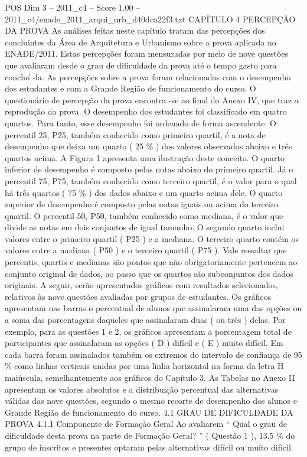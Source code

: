 \begin{textsample}{POS Dim 3 – 2011\_c4 – Score 1.00 – 2011\_c4/enade\_2011\_arqui\_urb\_d40dca22f3.txt}  \label{ex:f3_pos_224}
CAPÍTULO 4 PERCEPÇÃO DA PROVA As análises feitas neste capítulo tratam das percepções dos concluintes da Área de Arquitetura e Urbanismo sobre a prova aplicada no ENADE/2011.
Estas percepções foram mensuradas por meio de nove questões que avaliaram desde o grau de dificuldade da prova até o tempo gasto para concluí -la.
As percepções sobre a prova foram relacionadas com o desempenho dos estudantes e com a Grande Região de funcionamento do curso.
O questionário de percepção da prova encontra -se ao final do Anexo IV, que traz a reprodução da prova.
O desempenho dos estudantes foi classificado em quatro quartos.
Para tanto, esse desempenho foi ordenado de forma ascendente.
O percentil 25, P25, também conhecido como primeiro quartil, é a nota de desempenho que deixa um quarto ( 25 \% ) dos valores observados abaixo e três quartos acima.
A Figura 1 apresenta uma ilustração deste conceito.
O quarto inferior de desempenho é composto pelas notas abaixo do primeiro quartil.
Já o percentil 75, P75, também conhecido como terceiro quartil, é o valor para o qual há três quartos ( 75 \% ) dos dados abaixo e um quarto acima dele.
O quarto superior de desempenho é composto pelas notas iguais ou acima do terceiro quartil.
O percentil 50, P50, também conhecido como mediana, é o valor que divide as notas em dois conjuntos de igual tamanho.
O segundo quarto inclui valores entre o primeiro quartil ( P25 ) e a mediana.
O terceiro quarto contém os valores entre a mediana ( P50 ) e o terceiro quartil ( P75 ).
Vale ressaltar que percentis, quartis e medianas são pontos que não obrigatoriamente pertencem ao conjunto original de dados, ao passo que os quartos são subconjuntos dos dados originais.
A seguir, serão apresentados gráficos com resultados selecionados, relativos às nove questões avaliadas por grupos de estudantes.
Os gráficos apresentam nas barras o percentual de alunos que assinalaram uma das opções ou a soma das porcentagens daqueles que assinalaram duas ( ou três ) delas.
Por exemplo, para as questões 1 e 2, os gráficos apresentam a porcentagem total de participantes que assinalaram as opções ( D ) difícil e ( E ) muito difícil.
Em cada barra foram assinalados também os extremos do intervalo de confiança de 95 \% como linhas verticais unidas por uma linha horizontal na forma da letra H maiúscula, semelhantemente aos gráficos do Capítulo 3.
As Tabelas no Anexo II apresentam os valores absolutos e a distribuição percentual das alternativas válidas das nove questões, segundo o mesmo recorte de desempenho dos alunos e Grande Região de funcionamento do curso. 4.1 GRAU DE DIFICULDADE DA PROVA 4.1.1 Componente de Formação Geral Ao avaliarem “ Qual o grau de dificuldade desta prova na parte de Formação Geral? ” ( Questão 1 ), 13,5 \% do grupo de inscritos e presentes optaram pelas alternativas difícil ou muito difícil.

\end{textsample}
